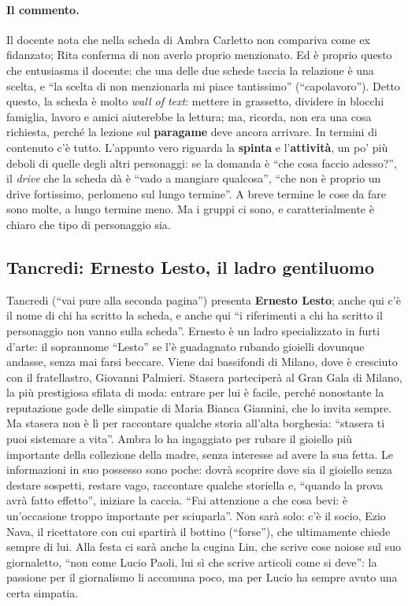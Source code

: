\paragraph{Il commento.} Il docente nota che nella scheda di Ambra Carletto non
compariva come ex fidanzato; Rita conferma di non averlo proprio menzionato. Ed è
proprio questo che entusiasma il docente: che una delle due schede taccia la
relazione è una scelta, e ``la scelta di non menzionarla mi piace tantissimo''
(``capolavoro''). Detto questo, la scheda è molto \emph{wall of text}: mettere in
grassetto, dividere in blocchi famiglia, lavoro e amici aiuterebbe la lettura;
ma, ricorda, non era una cosa richiesta, perché la lezione sul \textbf{paragame}
deve ancora arrivare. In termini di contenuto c'è tutto. L'appunto vero riguarda
la \textbf{spinta} e l'\textbf{attività}, un po' più deboli di quelle degli altri
personaggi: se la domanda è ``che cosa faccio adesso?'', il \emph{drive} che la
scheda dà è ``vado a mangiare qualcosa'', ``che non è proprio un drive
fortissimo, perlomeno sul lungo termine''. A breve termine le cose da fare sono
molte, a lungo termine meno. Ma i gruppi ci sono, e caratterialmente è chiaro che
tipo di personaggio sia.

\subsection{Tancredi: Ernesto Lesto, il ladro gentiluomo}

Tancredi (``vai pure alla seconda pagina'') presenta \textbf{Ernesto Lesto}; anche
qui c'è il nome di chi ha scritto la scheda, e anche qui ``i riferimenti a chi ha
scritto il personaggio non vanno sulla scheda''. Ernesto è un ladro specializzato
in furti d'arte: il soprannome ``Lesto'' se l'è guadagnato rubando gioielli
dovunque andasse, senza mai farsi beccare. Viene dai bassifondi di Milano, dove è
cresciuto con il fratellastro, Giovanni Palmieri. Stasera parteciperà al Gran Gala
di Milano, la più prestigiosa sfilata di moda: entrare per lui è facile, perché
nonostante la reputazione gode delle simpatie di Maria Bianca Giannini, che lo
invita sempre. Ma stasera non è lì per raccontare qualche storia all'alta
borghesia: ``stasera ti puoi sistemare a vita''. Ambra lo ha ingaggiato per rubare
il gioiello più importante della collezione della madre, senza interesse ad avere
la sua fetta. Le informazioni in suo possesso sono poche: dovrà scoprire dove sia il
gioiello senza destare sospetti, restare vago, raccontare qualche storiella e,
``quando la prova avrà fatto effetto'', iniziare la caccia. ``Fai attenzione a che
cosa bevi: è un'occasione troppo importante per sciuparla''. Non sarà solo: c'è il
socio, Ezio Nava, il ricettatore con cui spartirà il bottino (``forse''), che ultimamente
chiede sempre di lui. Alla festa ci sarà anche la cugina Lin, che scrive cose
noiose sul suo giornaletto, ``non come Lucio Paoli, lui sì che scrive articoli come
si deve'': la passione per il giornalismo li accomuna poco, ma per Lucio ha
sempre avuto una certa simpatia.

